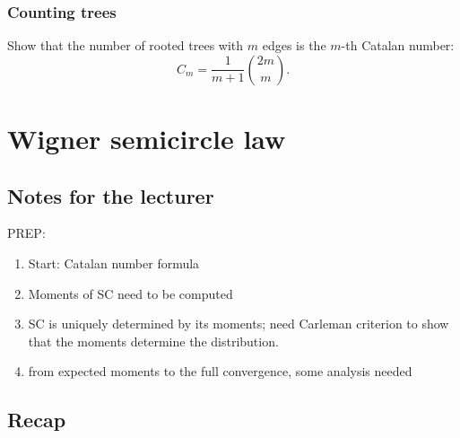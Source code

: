 \documentclass[letterpaper,11pt,oneside,reqno]{book}
\numberwithin{equation}{chapter}  %
\theoremstyle{definition}
\newenvironment{lnotes}{\section*{Notes for the lecturer}}{}
\begin{document}
\subsection{Counting trees}
\label{lecture1:prob:counting-trees}

Show that the number of rooted trees with $m$ edges is the $m$-th Catalan number:
\begin{equation*}
	C_m = \frac{1}{m+1}\binom{2m}{m}.
\end{equation*}

















\chapter{Wigner semicircle law}
\label{chap:lecture2}







\begin{lnotes}
	PREP:
	\begin{enumerate}
		\item Start:
			Catalan number formula
		\item Moments of SC need to be computed
		\item
			SC is uniquely determined by its moments; need Carleman criterion to show that the moments determine the distribution.
		\item from expected moments to the full convergence, some analysis needed
	\end{enumerate}
\end{lnotes}


\section{Recap}
\end{document}
